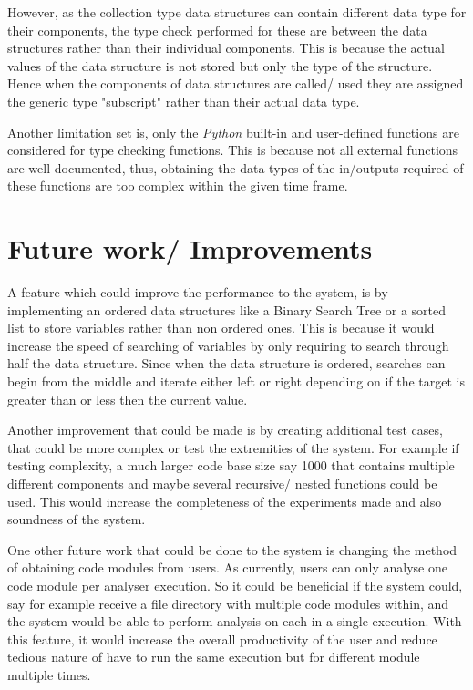 \documentclass{l4proj}
\begin{document}
However, as the collection type data structures can contain different data type for their components, the type check performed for these are between the data structures rather than their individual components. This is because the actual values of the data structure is not stored but only the type of the structure. Hence when the components of data structures are called/ used they are assigned the generic type "subscript" rather than their actual data type.

Another limitation set is, only the \emph{Python} built-in and user-defined functions are considered for type checking functions. This is because not all external functions are well documented, thus, obtaining the data types of the in/outputs required of these functions are too complex within the given time frame. 

\section{Future work/ Improvements}

A feature which could improve the performance to the system, is by implementing an ordered data structures like a Binary Search Tree or a sorted list  to store variables rather than non ordered ones. This is because it would increase the speed of searching of variables by only requiring to search through half the data structure. Since when the data structure is ordered, searches can begin from the middle and iterate either left or right depending on if the target is greater than or less then the current value.

Another improvement that could be made is by creating additional test cases, that could be more complex or test the extremities of the system. For example if testing complexity, a much larger code base size say 1000 that contains multiple different components and maybe several recursive/ nested functions could be used. This would increase the completeness of the experiments made and also soundness of the system.

One other future work that could be done to the system is changing the method of obtaining code modules from users. As currently, users can only analyse one code module per analyser execution. So it could be beneficial if the system could, say for example receive a file directory with multiple code modules within, and the system would be able to perform analysis on each in a single execution. With this feature, it would increase the overall productivity of the user and reduce tedious nature of have to run the same execution but for different module multiple times.
\end{document}
